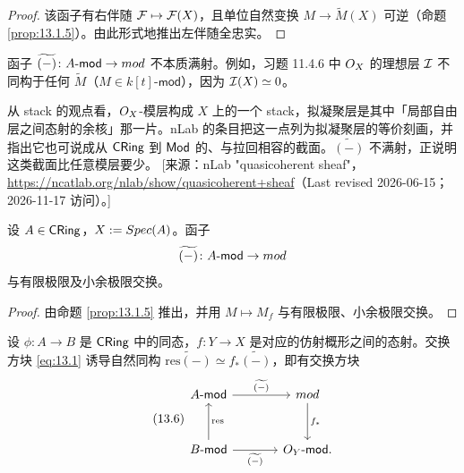\begin{proof}
该函子有右伴随 $\mathcal{F}\mapsto\mathcal{F}(X)$，且单位自然变换 $M\to\widetilde{M}(X)$ 可逆（命题 \ref{prop:13.1.5}）。由此形式地推出左伴随全忠实。
\end{proof}

\begin{warning}\label{warn:13.1.7}
函子 $\widetilde{(-)}\colon A\text{-}\mathsf{mod}\to mod$ 不本质满射。例如，习题 11.4.6 中 $O_X$ 的理想层 $\mathcal{I}$ 不同构于任何 $\widetilde{M}$（$M\in k[t]\text{-}\mathsf{mod}$），因为 $\mathcal{I}(X)\simeq 0$。
\end{warning}

\begin{yizhu}
从 stack 的观点看，$O_X$-模层构成 $X$ 上的一个 stack，拟凝聚层是其中「局部自由层之间态射的余核」那一片。nLab 的条目把这一点列为拟凝聚层的等价刻画，并指出它也可说成从 $\mathsf{CRing}$ 到 $\mathsf{Mod}$ 的、与拉回相容的截面。$\widetilde{(-)}$ 不满射，正说明这类截面比任意模层要少。
[来源：nLab "quasicoherent sheaf"，\url{https://ncatlab.org/nlab/show/quasicoherent+sheaf}（Last revised 2026-06-15；2026-11-17 访问）。]
\end{yizhu}

\begin{corollary}\label{cor:13.1.8}
设 $A\in\mathsf{CRing}$，$X:=Spec(A)$。函子
\[
\widetilde{(-)}\colon A\text{-}\mathsf{mod}\to mod
\]
与有限极限及小余极限交换。
\end{corollary}

\begin{proof}
由命题 \ref{prop:13.1.5} 推出，并用 $M\mapsto M_f$ 与有限极限、小余极限交换。
\end{proof}

\begin{corollary}\label{cor:13.1.9}
设 $\phi\colon A\to B$ 是 $\mathsf{CRing}$ 中的同态，$f\colon Y\to X$ 是对应的仿射概形之间的态射。交换方块 \eqref{eq:13.1} 诱导自然同构 $\widetilde{\mathrm{res}(-)}\simeq f_*\widetilde{(-)}$，即有交换方块
\begin{equation}\tag{13.6}\label{eq:13.6}
\begin{tikzcd}[row sep=3em,column sep=3.6em]
A\text{-}\mathsf{mod} \arrow[r,"\widetilde{(-)}"] & \omod \arrow[d,"f_*"]\\
B\text{-}\mathsf{mod} \arrow[r,"\widetilde{(-)}"'] \arrow[u,"\mathrm{res}"'] & \cO_Y\text{-}\mathsf{mod}.
\end{tikzcd}
\end{equation}
\end{corollary}

